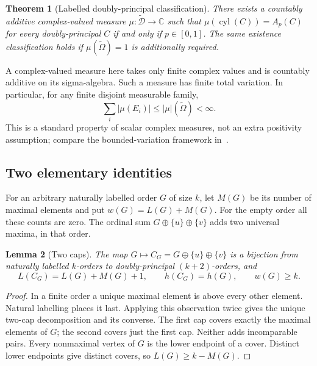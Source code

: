 \documentclass[11pt]{article}
\newtheorem{theorem}{Theorem}
\newtheorem{lemma}[theorem]{Lemma}
\theoremstyle{definition}
\newcommand{\Om}{\widetilde\Omega}
\newcommand{\D}{\widetilde{\mathcal D}}
\newcommand{\cyl}{\operatorname{cyl}}
\begin{document}
\begin{theorem}[Labelled doubly-principal classification]\label{thm:main}
There exists a countably additive complex-valued measure $\mu:\D\to\mathbb C$
such that $\mu(\cyl(C))=A_p(C)$ for every doubly-principal $C$ if and only if
$p\in[0,1]$. The same existence classification holds if $\mu(\Om)=1$ is
additionally required.
\end{theorem}

A complex-valued measure here takes only finite complex values and is
countably additive on its sigma-algebra. Such a measure has finite total
variation. In particular, for any finite disjoint measurable family,
\begin{equation}\label{eq:variation}
 \sum_i|\mu(E_i)|\le |\mu|(\Om)<\infty.
\end{equation}
This is a standard property of scalar complex measures, not an extra
positivity assumption; compare the bounded-variation framework
in~\cite[Sec.~2.3 and App.~B]{SZ}.

\subsection{Two elementary identities}
For an arbitrary naturally labelled order $G$ of size $k$, let $M(G)$ be
its number of maximal elements and put $w(G)=L(G)+M(G)$. For the empty
order all these counts are zero. The ordinal sum $G\oplus\{u\}\oplus\{v\}$
adds two universal maxima, in that order.

\begin{lemma}[Two caps]\label{lem:caps}
The map $G\mapsto C_G=G\oplus\{u\}\oplus\{v\}$ is a bijection from
naturally labelled $k$-orders to doubly-principal $(k+2)$-orders, and
\begin{equation}\label{eq:caps}
 L(C_G)=L(G)+M(G)+1,\qquad h(C_G)=h(G),\qquad w(G)\ge k.
\end{equation}
\end{lemma}
\begin{proof}
In a finite order a unique maximal element is above every other element.
Natural labelling places it last. Applying this observation twice gives the
unique two-cap decomposition and its converse. The first cap covers exactly
the maximal elements of $G$; the second covers just the first cap. Neither
adds incomparable pairs. Every nonmaximal vertex of $G$ is the lower endpoint
of a cover. Distinct lower endpoints give distinct covers, so
$L(G)\ge k-M(G)$.
\end{proof}
\end{document}
